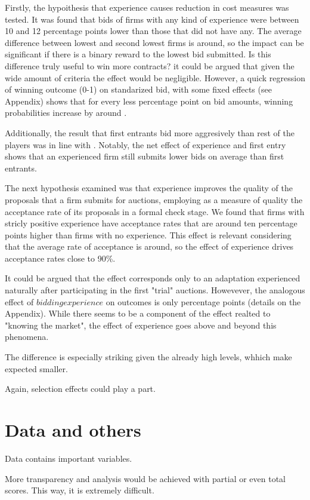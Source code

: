 Firstly, the hypoithesis that experience causes reduction in cost measures was tested. It was found that bids of firms with any kind of experience were between 10 and 12 percentage points lower than those that did not have any. The average difference between lowest and second lowest firms is around, so the impact can be significant if there is a binary reward to the lowest bid submitted. Is this difference truly useful to win more contracts? it could be argued that given the wide amount of criteria the effect would be negligible. However, a quick regression of winning outcome (0-1) on standarized bid, with some fixed effects (see Appendix) shows that for every less percentage point on bid amounts, winning probabilities increase by around .

Additionally, the result that first entrants bid more aggresively than rest of the players was in line with . Notably, the net effect of experience and first entry shows that an experienced firm still submits lower bids on average than first entrants.

The next hypothesis examined was that experience improves the quality of the proposals that a firm submits for auctions, employing as a measure of quality the acceptance rate of its proposals in a formal check stage. We found that firms with stricly positive experience have acceptance rates that are around ten percentage points higher than firms with no experience. This effect is relevant considering that the average rate of acceptance is around, so the effect of experience drives acceptance rates close to 90\%.

It could be argued that the effect corresponds only to an adaptation experienced naturally after participating in the first "trial" auctions. Howevever, the analogous effect of $bidding experience$ on outcomes is only percentage points (details on the Appendix). While there seems to be a component of the effect realted to "knowing the market", the effect of experience goes above and beyond this phenomena.

The difference is especially striking given the already high levels, whhich make expected smaller.

Again, selection effects could play a part.

\section{Data and others}
Data contains important variables.

More transparency and analysis would be achieved with partial or even total scores.
This way, it is extremely  difficult.

